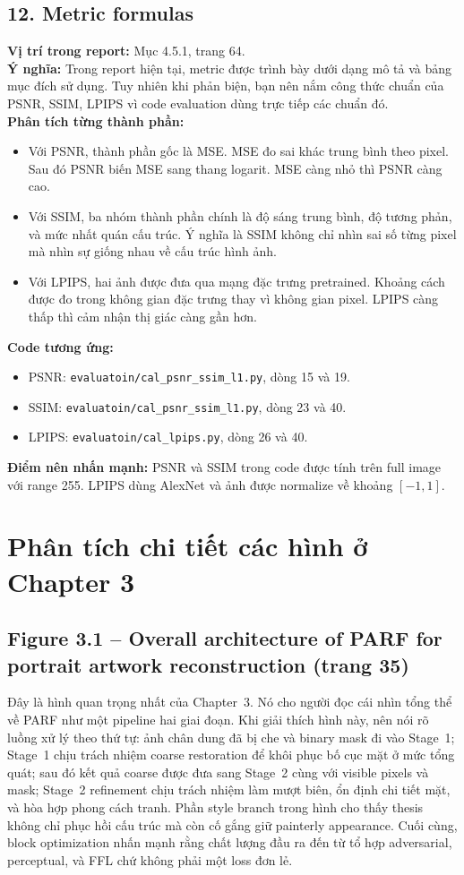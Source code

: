 \documentclass[12pt,a4paper]{article}
\begin{document}
\subsection*{12. Metric formulas}
\textbf{Vị trí trong report:} Mục 4.5.1, trang 64.\\
\textbf{Ý nghĩa:} Trong report hiện tại, metric được trình bày dưới dạng mô tả và bảng mục đích sử dụng. Tuy nhiên khi phản biện, bạn nên nắm công thức chuẩn của PSNR, SSIM, LPIPS vì code evaluation dùng trực tiếp các chuẩn đó.\\
\textbf{Phân tích từng thành phần:}
\begin{itemize}[leftmargin=1.5em]
\item Với PSNR, thành phần gốc là MSE. MSE đo sai khác trung bình theo pixel. Sau đó PSNR biến MSE sang thang logarit. MSE càng nhỏ thì PSNR càng cao.
\item Với SSIM, ba nhóm thành phần chính là độ sáng trung bình, độ tương phản, và mức nhất quán cấu trúc. Ý nghĩa là SSIM không chỉ nhìn sai số từng pixel mà nhìn sự giống nhau về cấu trúc hình ảnh.
\item Với LPIPS, hai ảnh được đưa qua mạng đặc trưng pretrained. Khoảng cách được đo trong không gian đặc trưng thay vì không gian pixel. LPIPS càng thấp thì cảm nhận thị giác càng gần hơn.
\end{itemize}
\textbf{Code tương ứng:}
\begin{itemize}[leftmargin=1.5em]
\item PSNR: \texttt{evaluatoin/cal\_psnr\_ssim\_l1.py}, dòng 15 và 19.
\item SSIM: \texttt{evaluatoin/cal\_psnr\_ssim\_l1.py}, dòng 23 và 40.
\item LPIPS: \texttt{evaluatoin/cal\_lpips.py}, dòng 26 và 40.
\end{itemize}
\textbf{Điểm nên nhấn mạnh:} PSNR và SSIM trong code được tính trên full image với range 255. LPIPS dùng AlexNet và ảnh được normalize về khoảng $[-1,1]$.

\section{Phân tích chi tiết các hình ở Chapter 3}

\subsection*{Figure 3.1 -- Overall architecture of PARF for portrait artwork reconstruction (trang 35)}
Đây là hình quan trọng nhất của Chapter~3. Nó cho người đọc cái nhìn tổng thể về PARF như một pipeline hai giai đoạn. Khi giải thích hình này, nên nói rõ luồng xử lý theo thứ tự: ảnh chân dung đã bị che và binary mask đi vào Stage~1; Stage~1 chịu trách nhiệm coarse restoration để khôi phục bố cục mặt ở mức tổng quát; sau đó kết quả coarse được đưa sang Stage~2 cùng với visible pixels và mask; Stage~2 refinement chịu trách nhiệm làm mượt biên, ổn định chi tiết mặt, và hòa hợp phong cách tranh. Phần style branch trong hình cho thấy thesis không chỉ phục hồi cấu trúc mà còn cố gắng giữ painterly appearance. Cuối cùng, block optimization nhấn mạnh rằng chất lượng đầu ra đến từ tổ hợp adversarial, perceptual, và FFL chứ không phải một loss đơn lẻ.
\end{document}
